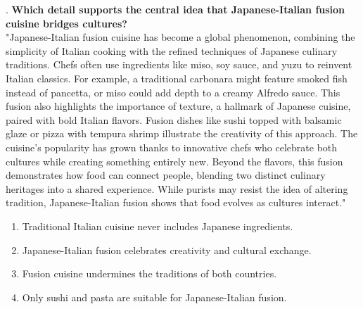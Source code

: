 \documentclass[12pt]{article}
\begin{document}
\vspace{1cm}
. \textbf{Which detail supports the central idea that Japanese-Italian fusion cuisine bridges cultures?\\}
"Japanese-Italian fusion cuisine has become a global phenomenon, combining the simplicity of Italian cooking with the refined techniques of Japanese culinary \\traditions. Chefs often use ingredients like miso, soy sauce, and yuzu to reinvent Italian classics. For example, a traditional carbonara might feature smoked fish instead of pancetta, or miso could add depth to a creamy Alfredo sauce. This fusion also highlights the importance of texture, a hallmark of Japanese cuisine, paired with bold Italian flavors. Fusion dishes like sushi topped with balsamic glaze or pizza with tempura shrimp illustrate the creativity of this approach. The cuisine’s popularity has grown thanks to innovative chefs who celebrate both cultures while creating something entirely new. Beyond the flavors, this fusion demonstrates how food can connect people, blending two distinct culinary heritages into a shared experience. While purists may resist the idea of altering tradition, Japanese-Italian fusion shows that food evolves as cultures interact."  
\begin{enumerate}[label=\Alph*.]
    \item Traditional Italian cuisine never includes Japanese ingredients.  
    \item Japanese-Italian fusion celebrates creativity and cultural exchange.  
    \item Fusion cuisine undermines the traditions of both countries.  
    \item Only sushi and pasta are suitable for Japanese-Italian fusion.  
\end{enumerate}

\newpage
\end{document}
